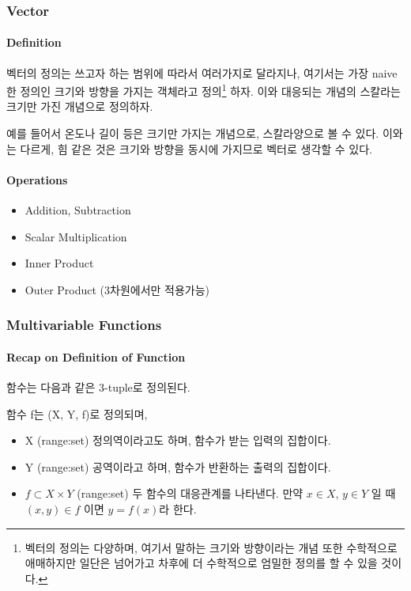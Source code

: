 \subsubsection{Vector} 

\paragraph{Definition} 벡터의 정의는 쓰고자 하는 범위에 따라서 여러가지로 달라지나, 여기서는 가장 naive한 정의인 크기와 방향을 가지는 객체라고 정의\footnote{벡터의 정의는 다양하며, 여기서 말하는 크기와 방향이라는 개념 또한 수학적으로 애매하지만 일단은 넘어가고 차후에 더 수학적으로 엄밀한 정의를 할 수 있을 것이다.} 하자. 이와 대응되는 개념의 스칼라는 크기만 가진 개념으로 정의하자. 

예를 들어서 온도나 길이 등은 크기만 가지는 개념으로, 스칼라양으로 볼 수 있다. 이와는 다르게, 힘 같은 것은 크기와 방향을 동시에 가지므로 벡터로 생각할 수 있다. 

\paragraph{Operations} 

\begin{itemize}
\item Addition, Subtraction 
\item Scalar Multiplication 
\item Inner Product
\item Outer Product (3차원에서만 적용가능)
\end{itemize}


\subsubsection{Multivariable Functions} 

\paragraph{Recap on Definition of Function}  함수는 다음과 같은 3-tuple로 정의된다. 
\begin{definition} 
함수 f는 (X, Y, f)로 정의되며, 
\begin{itemize} 
\item X (range:set) 정의역이라고도 하며, 함수가 받는 입력의 집합이다. 
\item Y (range:set) 공역이라고 하며, 함수가 반환하는 출력의 집합이다. 
\item $f \subset X \times Y$ (range:set) 두 함수의 대응관계를 나타낸다. 만약 $x \in X$, $y \in Y$ 일 때 $(x,y) \in f$ 이면 $y=f(x)$라 한다. 
\end{itemize}
\end{definition}


